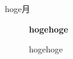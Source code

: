 ﻿\begin{description}
 \item[hoge月] \textbf{hogehoge}\par
 hogehoge\newline
  \par
\end{description}
